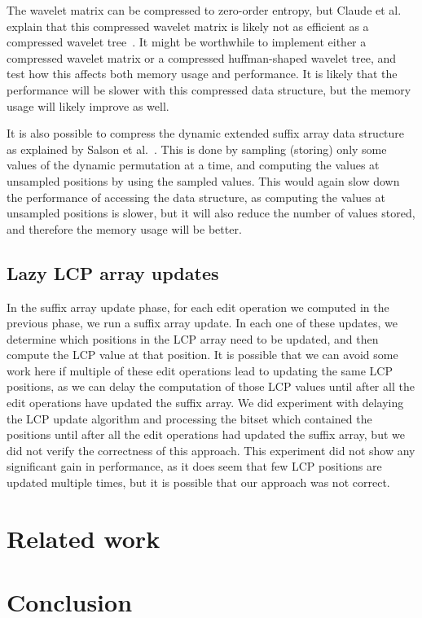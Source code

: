 The wavelet matrix can be compressed to zero-order entropy, but Claude et al. explain that
this compressed wavelet matrix is likely not as efficient as a compressed wavelet
tree~\cite{WaveletMatrix}. It might be worthwhile to implement either a compressed wavelet
matrix or a compressed huffman-shaped wavelet tree, and test how this affects both memory
usage and performance. It is likely that the performance will be slower with this
compressed data structure, but the memory usage will likely improve as well.

It is also possible to compress the dynamic extended suffix array data structure as
explained by Salson et al.~\cite{DynamicExtendedSuffixArrays}. This is done by sampling
(storing) only some values of the dynamic permutation at a time, and computing the values
at unsampled positions by using the sampled values. This would again slow down the
performance of accessing the data structure, as computing the values at unsampled
positions is slower, but it will also reduce the number of values stored, and therefore
the memory usage will be better.

\subsection*{Lazy LCP array updates}

In the suffix array update phase, for each edit operation we computed in the previous
phase, we run a suffix array update. In each one of these updates, we determine which
positions in the LCP array need to be updated, and then compute the LCP value at that
position. It is possible that we can avoid some work here if multiple of these edit
operations lead to updating the same LCP positions, as we can delay the computation of
those LCP values until after all the edit operations have updated the suffix array. We did
experiment with delaying the LCP update algorithm and processing the bitset which
contained the positions until after all the edit operations had updated the suffix array,
but we did not verify the correctness of this approach. This experiment did not show any
significant gain in performance, as it does seem that few LCP positions are updated
multiple times, but it is possible that our approach was not correct.

\section{Related work}


\section{Conclusion}
